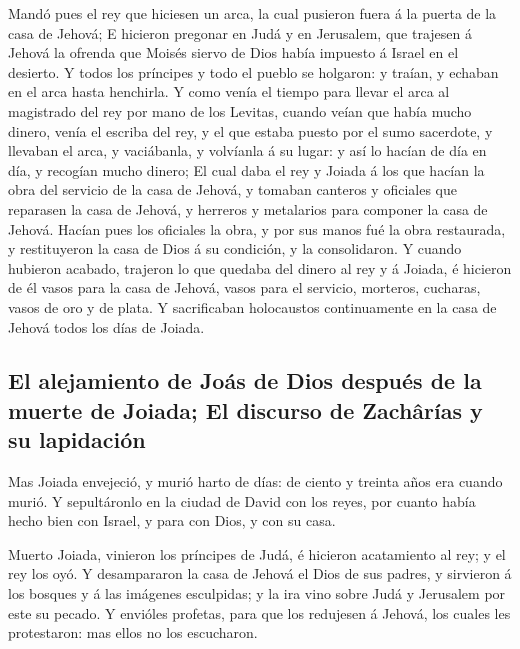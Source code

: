  Mandó pues el rey que hiciesen un arca, la cual pusieron
fuera á la puerta de la casa de Jehová;  E hicieron
pregonar en Judá y en Jerusalem, que trajesen á Jehová la ofrenda que
Moisés siervo de Dios había impuesto á Israel en el desierto.
 Y todos los príncipes y todo el pueblo se holgaron: y
traían, y echaban en el arca hasta henchirla.  Y como
venía el tiempo para llevar el arca al magistrado del rey por mano de
los Levitas, cuando veían que había mucho dinero, venía el escriba del
rey, y el que estaba puesto por el sumo sacerdote, y llevaban el arca, y
vaciábanla, y volvíanla á su lugar: y así lo hacían de día en día, y
recogían mucho dinero;  El cual daba el rey y Joiada á
los que hacían la obra del servicio de la casa de Jehová, y tomaban
canteros y oficiales que reparasen la casa de Jehová, y herreros y
metalarios para componer la casa de Jehová.  Hacían pues
los oficiales la obra, y por sus manos fué la obra restaurada, y
restituyeron la casa de Dios á su condición, y la consolidaron.
 Y cuando hubieron acabado, trajeron lo que quedaba del
dinero al rey y á Joiada, é hicieron de él vasos para la casa de Jehová,
vasos para el servicio, morteros, cucharas, vasos de oro y de plata. Y
sacrificaban holocaustos continuamente en la casa de Jehová todos los
días de Joiada.

\hypertarget{el-alejamiento-de-jouxe1s-de-dios-despuuxe9s-de-la-muerte-de-joiada-el-discurso-de-zachuxe2ruxedas-y-su-lapidaciuxf3n}{%
\subsection{El alejamiento de Joás de Dios después de la muerte de
Joiada; El discurso de Zachârías y su
lapidación}\label{el-alejamiento-de-jouxe1s-de-dios-despuuxe9s-de-la-muerte-de-joiada-el-discurso-de-zachuxe2ruxedas-y-su-lapidaciuxf3n}}

 Mas Joiada envejeció, y murió harto de días: de ciento y
treinta años era cuando murió.  Y sepultáronlo en la
ciudad de David con los reyes, por cuanto había hecho bien con Israel, y
para con Dios, y con su casa.

 Muerto Joiada, vinieron los príncipes de Judá, é
hicieron acatamiento al rey; y el rey los oyó.  Y
desampararon la casa de Jehová el Dios de sus padres, y sirvieron á los
bosques y á las imágenes esculpidas; y la ira vino sobre Judá y
Jerusalem por este su pecado.  Y envióles profetas, para
que los redujesen á Jehová, los cuales les protestaron: mas ellos no los
escucharon.


